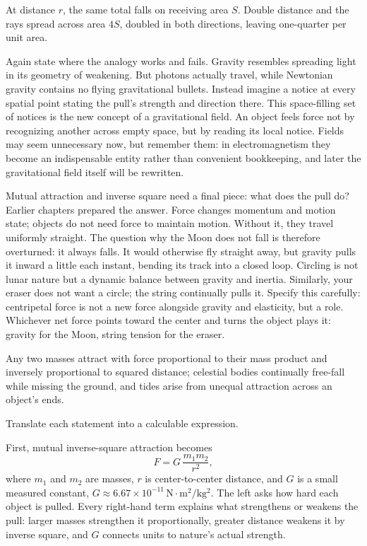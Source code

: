 At distance \(r\), the same total falls on receiving area \(S\). Double distance and the rays spread across area \(4S\), doubled in both directions, leaving one-quarter per unit area.

Again state where the analogy works and fails. Gravity resembles spreading light in its geometry of weakening. But photons actually travel, while Newtonian gravity contains no flying gravitational bullets. Instead imagine a notice at every spatial point stating the pull's strength and direction there. This space-filling set of notices is the new concept of a gravitational field. An object feels force not by recognizing another across empty space, but by reading its local notice. Fields may seem unnecessary now, but remember them: in electromagnetism they become an indispensable entity rather than convenient bookkeeping, and later the gravitational field itself will be rewritten.

Mutual attraction and inverse square need a final piece: what does the pull do? Earlier chapters prepared the answer. Force changes momentum and motion state; objects do not need force to maintain motion. Without it, they travel uniformly straight. The question why the Moon does not fall is therefore overturned: it always falls. It would otherwise fly straight away, but gravity pulls it inward a little each instant, bending its track into a closed loop. Circling is not lunar nature but a dynamic balance between gravity and inertia. Similarly, your eraser does not want a circle; the string continually pulls it. Specify this carefully: centripetal force is not a new force alongside gravity and elasticity, but a role. Whichever net force points toward the center and turns the object plays it: gravity for the Moon, string tension for the eraser.


\begin{oneline}
Any two masses attract with force proportional to their mass product and inversely proportional to squared distance; celestial bodies continually free-fall while missing the ground, and tides arise from unequal attraction across an object's ends.
\end{oneline}


Translate each statement into a calculable expression.

First, mutual inverse-square attraction becomes
\[
F = G\,\frac{m_{1} m_{2}}{r^{2}},
\]
where \(m_{1}\) and \(m_{2}\) are masses, \(r\) is center-to-center distance, and \(G\) is a small measured constant, \(G \approx 6.67\times 10^{-11}\,\mathrm{N\cdot m^{2}/kg^{2}}\). The left asks how hard each object is pulled. Every right-hand term explains what strengthens or weakens the pull: larger masses strengthen it proportionally, greater distance weakens it by inverse square, and \(G\) connects units to nature's actual strength.

